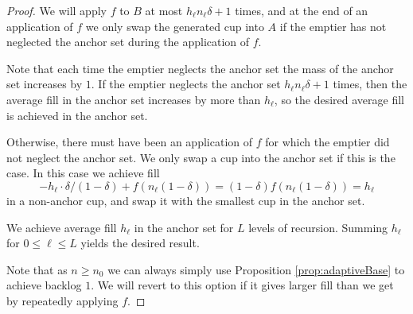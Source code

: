 \documentclass[twocolumn]{article}[10pt]
\begin{document}
\begin{proof}
  We will apply $f$ to $B$ at most $h_\ell n_\ell\delta + 1$ times, and at the
  end of an application of $f$ we only swap the generated cup into $A$ if the
  emptier has not neglected the anchor set during the application of $f$.

  Note that each time the emptier neglects the anchor set the mass of the
  anchor set increases by $1$. If the emptier neglects the anchor set $h_\ell
  n_\ell\delta + 1$ times, then the average fill in the anchor set increases by
  more than $h_\ell$, so the desired average fill is achieved in the anchor set.

  Otherwise, there must have been an application of $f$ for which the emptier
  did not neglect the anchor set. We only swap a cup into the anchor set if
  this is the case. In this case we achieve fill 
  $$-h_\ell \cdot \delta/(1-\delta) + f(n_\ell (1-\delta)) = (1-\delta)f(n_\ell
  (1-\delta)) = h_\ell$$
  in a non-anchor cup, and swap it with the smallest cup in the anchor set.

  We achieve average fill $h_\ell$ in the anchor set for $L$ levels of
  recursion. Summing $h_\ell$ for $0\le \ell \le L$ yields the desired result.

  Note that as $n\ge n_0$ we can always simply use Proposition
  \ref{prop:adaptiveBase} to achieve backlog $1$. We will revert to this option
  if it gives larger fill than we get by repeatedly applying $f$.
\end{proof}
\end{document}
